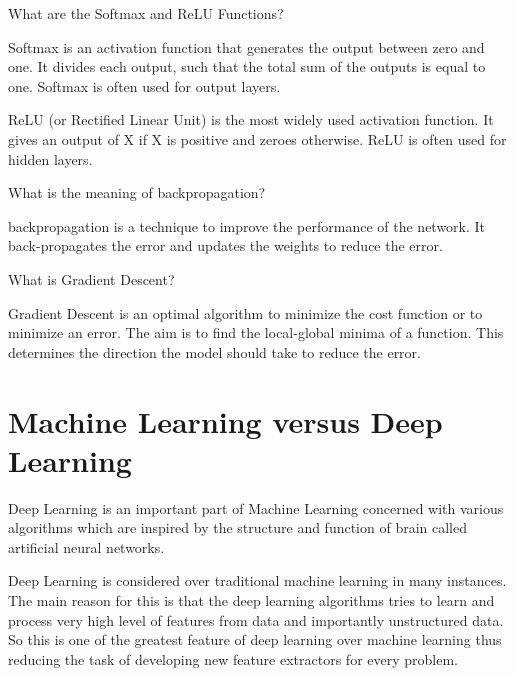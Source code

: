 	\begin{qanda}
		\begin{question}
What are the Softmax and ReLU Functions?
		\end{question}
		\begin{answer}
Softmax is an activation function that generates the output between zero and one. It divides each output, such that the total sum of the outputs is equal to one. Softmax is often used for output layers.

ReLU (or Rectified Linear Unit) is the most widely used activation function. It gives an output of X if X is positive and zeroes otherwise. ReLU is often used for hidden layers.%
		\end{answer}
	\end{qanda}

	\begin{qanda}
		\begin{question}
What is the meaning of backpropagation?
		\end{question}
		\begin{answer}
backpropagation is a technique to improve the performance of the network. It back-propagates the error and updates the weights to reduce the error.
		\end{answer}
	\end{qanda}

	\begin{qanda}
		\begin{question}
What is Gradient Descent?
		\end{question}
		\begin{answer}
Gradient Descent is an optimal algorithm to minimize the cost function or to minimize an error. The aim is to find the local-global minima of a function. This determines the direction the model should take to reduce the error.
		\end{answer}
	\end{qanda}

	\section{Machine Learning versus Deep Learning}

	\begin{bulletedlist}
		\item Deep Learning is an important part of Machine Learning concerned with various algorithms which are inspired by the structure and function of brain called artificial
neural networks.
		\item Deep Learning is considered over traditional machine learning in many instances. The main reason for this is that the deep learning algorithms tries to learn and process very
high level of features from data and importantly unstructured data. So this is one of the greatest feature of deep learning over machine learning thus reducing the task of developing new feature extractors for every problem.
	\end{bulletedlist}

